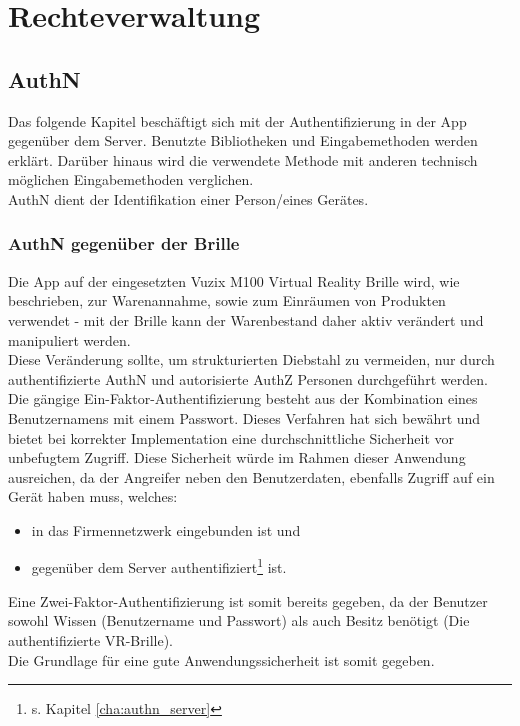 \section{Rechteverwaltung}
\label{cha:rechteverwaltung_vr}

\subsection{\acf{AuthN}}
Das folgende Kapitel beschäftigt sich mit der Authentifizierung in der App gegenüber dem Server. Benutzte Bibliotheken und Eingabemethoden werden erklärt. Darüber hinaus wird die verwendete Methode mit anderen technisch möglichen Eingabemethoden verglichen.\\

\acl{AuthN} dient der Identifikation einer Person/eines Gerätes.

\subsubsection{\acs{AuthN} gegenüber der Brille}
Die App auf der eingesetzten Vuzix M100 Virtual Reality Brille wird, wie beschrieben, zur Warenannahme, sowie zum Einräumen von Produkten verwendet - mit der Brille kann der Warenbestand daher aktiv verändert und manipuliert werden.\\
Diese Veränderung sollte, um \zB strukturierten Diebstahl zu vermeiden, nur durch authentifizierte \acs{AuthN} und autorisierte \acs{AuthZ} Personen durchgeführt werden.\\

Die gängige Ein-Faktor-Authentifizierung besteht aus der Kombination eines Benutzernamens mit einem Passwort. Dieses Verfahren hat sich bewährt und bietet bei korrekter Implementation eine durchschnittliche Sicherheit vor unbefugtem Zugriff. Diese Sicherheit würde im Rahmen dieser Anwendung ausreichen, da der Angreifer neben den Benutzerdaten, ebenfalls Zugriff auf ein Gerät haben muss, welches:
\begin{itemize}
	\item in das Firmennetzwerk eingebunden ist und
	\item gegenüber dem Server authentifiziert\footnote{s. Kapitel \ref{cha:authn_server}} ist.
\end{itemize}
Eine Zwei-Faktor-Authentifizierung ist somit bereits gegeben, da der Benutzer sowohl Wissen (Benutzername und Passwort) als auch Besitz benötigt (Die authentifizierte \acl{VR}-Brille).\\
Die Grundlage für eine gute Anwendungssicherheit ist somit gegeben.

